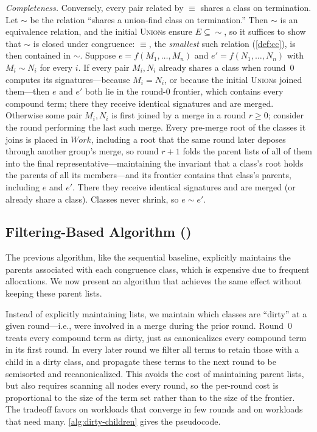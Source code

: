 \emph{Completeness.} Conversely, every pair related by $\equiv$ shares a class
on termination. Let $\sim$ be the relation ``shares a union-find class on
termination.'' Then $\sim$ is an equivalence relation, and the initial
\textsc{Union}s ensure $E \subseteq {\sim}$, so it suffices to show that
$\sim$ is closed under congruence: $\equiv$, the \emph{smallest} such relation
(\autoref{def:cc}), is then contained in $\sim$. Suppose
$e = f(M_1,\ldots,M_n)$ and $e' = f(N_1,\ldots,N_n)$ with $M_i \sim N_i$ for
every $i$. If every pair $M_i, N_i$ already shares a class when round~0
computes its signatures---because $M_i = N_i$, or because the initial
\textsc{Union}s joined them---then $e$ and $e'$ both lie in the round-0
frontier, which contains every compound term; there they receive identical
signatures and are merged. Otherwise some pair $M_i, N_i$ is first joined by
a merge in a round $r \geq 0$; consider the round performing the last such
merge. Every pre-merge root of the classes it joins is placed in
$\mathit{Work}$, including a root that the same round later deposes through
another group's merge, so round $r+1$ folds the parent lists of all of them
into the final representative---maintaining the invariant that a class's
root holds the parents of all its members---and its frontier contains that
class's parents, including $e$ and $e'$. There they receive identical
signatures and are merged (or already share a class). Classes never shrink,
so $e \sim e'$.


\subsection{Filtering-Based Algorithm (\filteralgo)}

The previous algorithm, like the sequential baseline, explicitly maintains
the parents associated with each congruence class, which is expensive due
to frequent allocations. We now present an algorithm that achieves the same
effect without keeping these parent lists.

Instead of explicitly maintaining lists, we maintain which classes are
``dirty'' at a given round---i.e., were involved in a merge during the prior
round. Round~0 treats every compound term as dirty, just as \parentalgo{}
canonicalizes every compound term in its first round. In every later round
we filter all terms to retain those with a child in a dirty class, and
propagate these terms to the next round to be semisorted and
recanonicalized. This avoids the cost of maintaining parent lists, but also
requires scanning all nodes every round, so the per-round cost is
proportional to the size of the term set rather than to the size of the
frontier. The tradeoff favors \filteralgo{} on workloads that converge in
few rounds and \parentalgo{} on workloads that need many.
\autoref{alg:dirty-children} gives the pseudocode.

